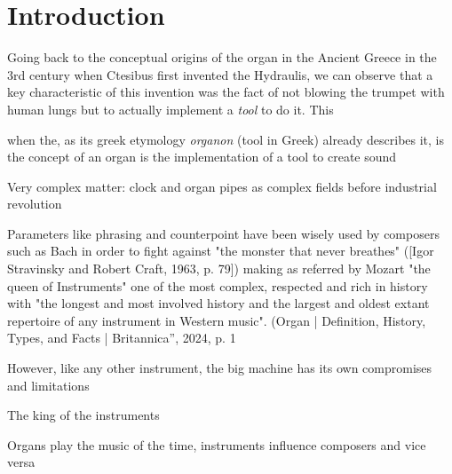 \chapter{Introduction}

Going back to the conceptual origins of the organ in the Ancient Greece in the 3rd century when Ctesibus first invented the Hydraulis, we can observe that a key characteristic of this invention was the fact of not blowing the trumpet with human lungs but to actually implement a \textit{tool} to do it. This



  when the, as its greek etymology \textit{organon} (tool in Greek) already describes it, is the concept of an organ is the implementation of a tool to create sound 

Very complex matter: clock and organ pipes as complex fields before industrial revolution 



Parameters like phrasing and counterpoint have been wisely used by composers such as Bach in order to fight against "the monster that never breathes" ([Igor Stravinsky and Robert Craft, 1963, p. 79]) making as referred by Mozart "the queen of Instruments" one of the most complex, respected and rich in history with "the longest and most involved history and the largest and oldest extant repertoire of any instrument in Western music". (Organ | Definition, History, Types, and Facts | Britannica”, 2024, p. 1


However, like any other instrument, the big machine has its own compromises and limitations

The king of the instruments 

Organs play the music of the time, instruments influence composers and vice versa 